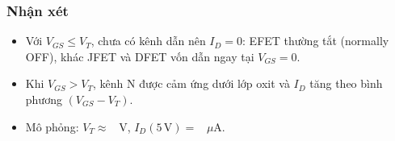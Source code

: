\subsubsection*{Nhận xét}
\begin{remarkbox}
\begin{itemize}[nosep]
  \item Với $V_{GS} \le V_T$, chưa có kênh dẫn nên $I_D = 0$: EFET thường tắt (normally OFF), khác JFET và DFET vốn dẫn ngay tại $V_{GS} = 0$.
  \item Khi $V_{GS} > V_T$, kênh N được cảm ứng dưới lớp oxit và $I_D$ tăng theo bình phương $(V_{GS} - V_T)$.
  \item Mô phỏng: $V_T \approx $ \fillcell\ V, $I_D(5\,\text{V}) = $ \fillcell\ $\mu$A.
\end{itemize}
\end{remarkbox}
